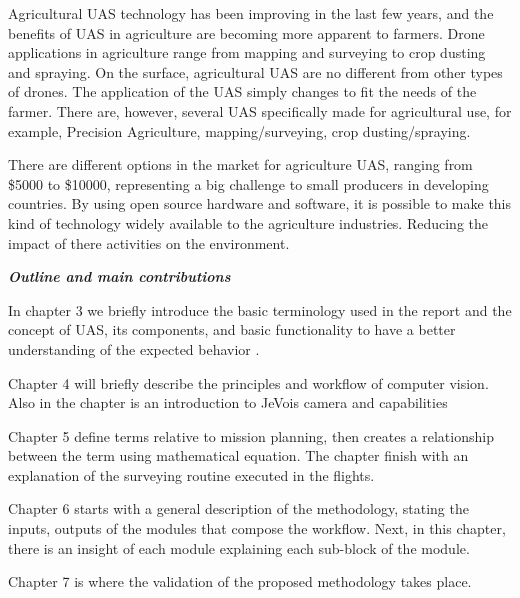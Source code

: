 
Agricultural UAS technology has been improving in the last few years, and the benefits of UAS in agriculture are becoming more apparent to farmers. Drone applications in agriculture range from mapping and surveying to crop dusting and spraying. On the surface, agricultural UAS are no different from other types of drones. The application of the UAS simply changes to fit the needs of the farmer. There are, however, several UAS specifically made for agricultural use, for example, Precision Agriculture, mapping/surveying, crop dusting/spraying. 

There are different options in the market for agriculture UAS, ranging from \$5000 to \$10000, representing a big challenge to small producers in developing countries. By using open source hardware and software, it is possible to make this kind of technology widely available to the agriculture industries. Reducing the impact of there activities on the environment.

\textit{\textbf{Outline and main contributions}}

In chapter 3 we briefly introduce the basic terminology used in the report and the concept of UAS, its components, and basic functionality to have a better understanding of the expected behavior .

Chapter 4 will briefly describe the principles and workflow of computer vision. Also in the chapter is an introduction to JeVois camera and capabilities

Chapter 5 define terms relative to mission planning, then creates a relationship between the term using mathematical equation.  The chapter finish with an explanation of the surveying routine executed in the flights.

Chapter 6 starts with a general description of the methodology, stating the inputs, outputs of the modules that compose the workflow. Next, in this chapter, there is an insight of each module explaining each sub-block of the module.

Chapter 7 is where the validation of the proposed methodology takes place. 
